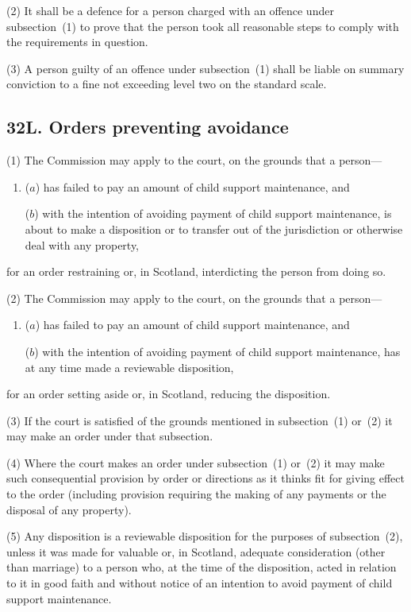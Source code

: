 \documentclass[12pt,a4paper]{article}
\begin{document}
(2)
It shall be a defence for a person charged with an offence under subsection~(1) to prove that the person took all reasonable steps to comply with the requirements in question.

(3)
A person guilty of an offence under subsection~(1) shall be liable on summary 
conviction to a fine not exceeding level two on the standard scale.


\subsection{32L. Orders preventing avoidance}

(1) The Commission may apply to the court, on the grounds that a person---
\begin{enumerate}\item[]
($a$) has failed to pay an amount of child support maintenance, and

($b$) with the intention of avoiding payment of child support maintenance, is about to make a disposition or to transfer out of the jurisdiction or otherwise deal with any property,
\end{enumerate}
for an order restraining or, in Scotland, interdicting the person from doing so.

(2) The Commission may apply to the court, on the grounds that a person---
\begin{enumerate}\item[]
($a$) has failed to pay an amount of child support maintenance, and

($b$) with the intention of avoiding payment of child support maintenance, has at any time made a reviewable disposition,
\end{enumerate}
for an order setting aside or, in Scotland, reducing the disposition.

(3)
If the court is satisfied of the grounds mentioned in subsection~(1) or~(2) it may make an order under that subsection.

(4)
Where the court makes an order under subsection~(1) or~(2) it may make such consequential provision by order or directions as it thinks fit for giving effect to the order (including provision requiring the making of any payments or the disposal of any property).

(5)
Any disposition is a reviewable disposition for the purposes of subsection~(2), unless it was made for valuable or, in Scotland, adequate consideration (other than marriage) to a person who, at the time of the disposition, acted in relation to it in good faith and without notice of an intention to avoid payment of child support maintenance.
\end{document}
